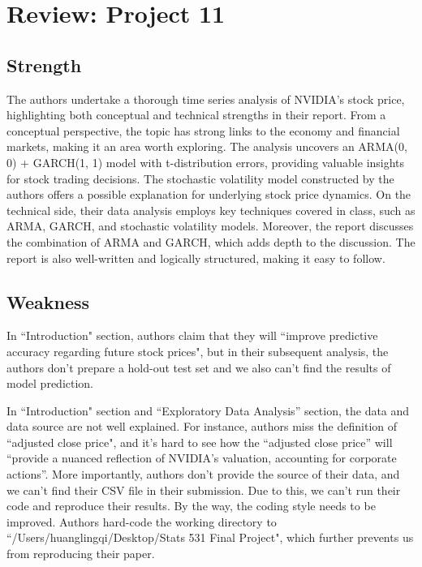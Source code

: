 \documentclass[12pt]{article}
\begin{document}
\section{Review: Project 11}

\subsection{Strength}

The authors undertake a thorough time series analysis of NVIDIA's stock price, highlighting both conceptual and technical strengths in their report. From a conceptual perspective, the topic has strong links to the economy and financial markets, making it an area worth exploring. The analysis uncovers an ARMA(0, 0) + GARCH(1, 1) model with t-distribution errors, providing valuable insights for stock trading decisions. The stochastic volatility model constructed by the authors offers a possible explanation for underlying stock price dynamics. On the technical side, their data analysis employs key techniques covered in class, such as ARMA, GARCH, and stochastic volatility models. Moreover, the report discusses the combination of ARMA and GARCH, which adds depth to the discussion. The report is also well-written and logically structured, making it easy to follow.


\subsection{Weakness}

In ``Introduction" section, authors claim that they will ``improve predictive accuracy regarding future stock prices", but in their subsequent analysis, the authors don't prepare a hold-out test set and we also can't find the results of model prediction.


In ``Introduction" section and ``Exploratory Data Analysis'' section, the data and data source are not well explained. For instance, authors miss the definition of ``adjusted close price", and it's hard to see how the ``adjusted close price'' will ``provide a nuanced reflection of NVIDIA's valuation, accounting for corporate actions''. More importantly, authors don't provide the source of their data, and we can't find their CSV file in their submission. Due to this, we can't run their code and reproduce their results. By the way, the coding style needs to be improved. Authors hard-code the working directory to ``/Users/huanglingqi/Desktop/Stats 531 Final Project", which further prevents us from reproducing their paper.
\end{document}

